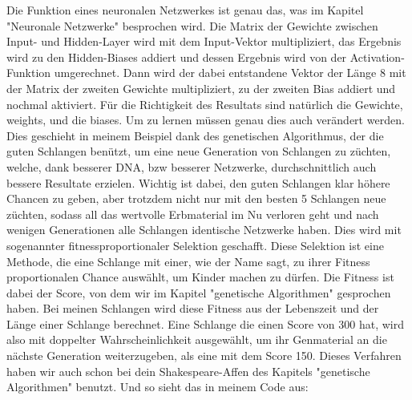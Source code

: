 \documentclass[11pt,a4paper,ngerman]{article}
\begin{document}
Die Funktion  eines neuronalen Netzwerkes ist genau das, was im Kapitel "Neuronale Netzwerke" besprochen wird. Die Matrix der Gewichte zwischen Input- und Hidden-Layer wird mit dem Input-Vektor multipliziert, das Ergebnis wird zu den Hidden-Biases addiert und dessen Ergebnis wird von der Activation-Funktion umgerechnet. Dann wird der dabei entstandene Vektor der Länge 8 mit der Matrix der zweiten Gewichte multipliziert, zu der zweiten Bias addiert und nochmal aktiviert. Für die Richtigkeit des Resultats sind natürlich die Gewichte, weights, und die biases. Um zu lernen müssen genau dies auch verändert werden. Dies geschieht in meinem Beispiel dank des genetischen Algorithmus, der die guten Schlangen benützt, um eine neue Generation von Schlangen zu züchten, welche, dank besserer DNA, bzw besserer Netzwerke, durchschnittlich auch bessere Resultate erzielen. Wichtig ist dabei, den guten Schlangen klar höhere Chancen zu geben, aber trotzdem nicht nur mit den besten 5 Schlangen neue züchten, sodass all das wertvolle Erbmaterial im Nu verloren geht und nach wenigen Generationen alle Schlangen identische Netzwerke haben. Dies wird mit sogenannter fitnessproportionaler Selektion geschafft. Diese Selektion ist eine Methode, die eine Schlange mit einer, wie der Name sagt, zu ihrer Fitness proportionalen Chance auswählt, um Kinder machen zu dürfen. Die Fitness ist dabei der Score, von dem wir im Kapitel "genetische Algorithmen" gesprochen haben. Bei meinen Schlangen wird diese Fitness aus der Lebenszeit und der Länge einer Schlange berechnet. Eine Schlange die einen Score von 300 hat, wird also mit doppelter Wahrscheinlichkeit ausgewählt, um ihr Genmaterial an die nächste Generation weiterzugeben, als eine mit dem Score 150. Dieses Verfahren haben wir auch schon bei dein Shakespeare-Affen des Kapitels "genetische Algorithmen" benutzt. Und so sieht 
das in meinem Code aus:
\end{document}

